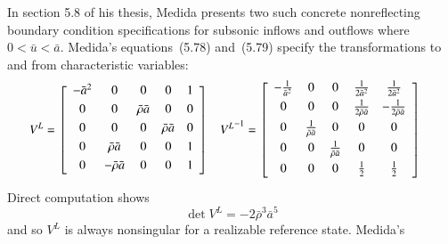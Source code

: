 \documentclass[letterpaper,11pt,nointlimits,reqno,draft]{amsart}
\begin{document}
In section 5.8 of his thesis, Medida presents two such concrete nonreflecting
boundary condition specifications for subsonic inflows and outflows where $0 <
\bar{u} < \bar{a}$.  Medida's equations~(5.78) and~(5.79) specify the
transformations to and from characteristic variables:
\begin{align}
\label{eq:dimeulerapproxmedidaproj}
  V^L &= \left[\begin{array}{ccccc}
    -\bar{a}^2 & 0                   & 0                  & 0                  & 1 \\ \noalign{\smallskip}
    0          & 0                   & \bar{\rho} \bar{a} & 0                  & 0 \\ \noalign{\smallskip}
    0          & 0                   & 0                  & \bar{\rho} \bar{a} & 0 \\ \noalign{\smallskip}
    0          & \bar{\rho} \bar{a}  & 0                  & 0                  & 1 \\ \noalign{\smallskip}
    0          & -\bar{\rho} \bar{a} & 0                  & 0                  & 1 \\ \noalign{\smallskip}
  \end{array}\right]
&
  {V^L}^{-1} &= \left[\begin{array}{ccccc}
    -\frac{1}{\bar{a}^2} & 0                            & 0                            & \frac{1}{2\bar{a}^2}          & \frac{1}{2\bar{a}^2}            \\ \noalign{\smallskip}
    0                    & 0                            & 0                            & \frac{1}{2\bar{\rho} \bar{a}} & - \frac{1}{2\bar{\rho} \bar{a}} \\ \noalign{\smallskip}
    0                    & \frac{1}{\bar{\rho} \bar{a}} & 0                            & 0                             & 0                               \\ \noalign{\smallskip}
    0                    & 0                            & \frac{1}{\bar{\rho} \bar{a}} & 0                             & 0                               \\ \noalign{\smallskip}
    0                    & 0                            & 0                            & \frac{1}{2}                   & \frac{1}{2}                     \\ \noalign{\smallskip}
  \end{array}\right]
\end{align}
Direct computation shows
\[
  \det V^L = -2\bar{\rho}^3\bar{a}^5
\]
and so $V^L$ is always nonsingular for a realizable reference state.  Medida's
\end{document}
